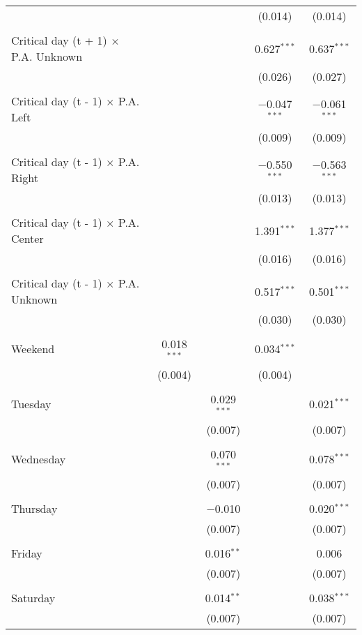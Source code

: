 \documentclass[
]{article}
\begin{document}
\begin{table}[!htbp]
{\begin{tabular}{@{\extracolsep{5pt}}lcccc}
  &  &  & (0.014) & (0.014) \\ 
  & & & & \\ 
 Critical day (t + 1) $\times$ P.A. Unknown &  &  & 0.627$^{***}$ & 0.637$^{***}$ \\ 
  &  &  & (0.026) & (0.027) \\ 
  & & & & \\ 
 Critical day (t - 1) $\times$ P.A. Left &  &  & $-$0.047$^{***}$ & $-$0.061$^{***}$ \\ 
  &  &  & (0.009) & (0.009) \\ 
  & & & & \\ 
 Critical day (t - 1) $\times$ P.A. Right &  &  & $-$0.550$^{***}$ & $-$0.563$^{***}$ \\ 
  &  &  & (0.013) & (0.013) \\ 
  & & & & \\ 
 Critical day (t - 1) $\times$ P.A. Center &  &  & 1.391$^{***}$ & 1.377$^{***}$ \\ 
  &  &  & (0.016) & (0.016) \\ 
  & & & & \\ 
 Critical day (t - 1) $\times$ P.A. Unknown &  &  & 0.517$^{***}$ & 0.501$^{***}$ \\ 
  &  &  & (0.030) & (0.030) \\ 
  & & & & \\ 
 Weekend & 0.018$^{***}$ &  & 0.034$^{***}$ &  \\ 
  & (0.004) &  & (0.004) &  \\ 
  & & & & \\ 
 Tuesday &  & 0.029$^{***}$ &  & 0.021$^{***}$ \\ 
  &  & (0.007) &  & (0.007) \\ 
  & & & & \\ 
 Wednesday &  & 0.070$^{***}$ &  & 0.078$^{***}$ \\ 
  &  & (0.007) &  & (0.007) \\ 
  & & & & \\ 
 Thursday &  & $-$0.010 &  & 0.020$^{***}$ \\ 
  &  & (0.007) &  & (0.007) \\ 
  & & & & \\ 
 Friday &  & 0.016$^{**}$ &  & 0.006 \\ 
  &  & (0.007) &  & (0.007) \\ 
  & & & & \\ 
 Saturday &  & 0.014$^{**}$ &  & 0.038$^{***}$ \\ 
  &  & (0.007) &  & (0.007) \\ 

\end{tabular}}
\end{table}
\end{document}
